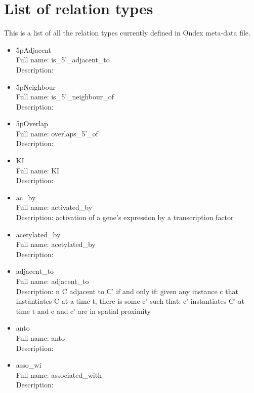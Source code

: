 \chapter{List of relation types}
\label{cha:relation_types}
This is a list of all the relation types currently defined in Ondex meta-data file.
\begin{itemize}


\item{5pAdjacent}\\ Full name: is\_5'\_adjacent\_to\\ Description: 

\item{5pNeighbour}\\ Full name: is\_5'\_neighbour\_of\\ Description: 

\item{5pOverlap}\\ Full name: overlaps\_5'\_of\\ Description: 

\item{KI}\\ Full name: KI\\ Description: 

\item{ac\_by}\\ Full name: activated\_by\\ Description: activation of a gene's expression by a transcription factor 

\item{acetylated\_by}\\ Full name: acetylated\_by\\ Description: 

\item{adjacent\_to}\\ Full name: adjacent\_to\\ Description: n C adjacent to C' if and only if: given any instance c that instantiates C at a time t, there is some c' such that: c' instantiates C' at time t and c and c' are in spatial proximity 

\item{anto}\\ Full name: anto\\ Description: 

\item{asso\_wi}\\ Full name: associated\_with\\ Description: 


\end{itemize}
